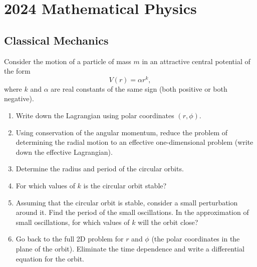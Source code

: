 \section{2024 Mathematical Physics}

\subsection{Classical Mechanics}

\begin{exercise}
\label{physics:2024:1}
Consider the motion of a particle of mass $m$ in an attractive central potential of the form
\begin{equation}
    V (r) = \alpha r ^ {k}, \label{eq:2024:1:1}
\end{equation}
where $k$ and $\alpha$ are real constants of the same sign (both positive or both negative).

\begin{enumerate}[label=(\alph*)]
    \item Write down the Lagrangian using polar coordinates $( r , \phi )$.
    \item Using conservation of the angular momentum, reduce the problem of determining the radial motion to an effective one-dimensional problem (write down the effective Lagrangian).
    \item Determine the radius and period of the circular orbits.
    \item For which values of $k$ is the circular orbit stable?
    \item Assuming that the circular orbit is stable, consider a small perturbation around it. Find the period of the small oscillations. In the approximation of small oscillations, for which values of $k$ will the orbit close?
    \item Go back to the full 2D problem for $r$ and $\phi$ (the polar coordinates in the plane of the orbit). Eliminate the time dependence and write a differential equation for the orbit.
\end{enumerate}
\end{exercise}

